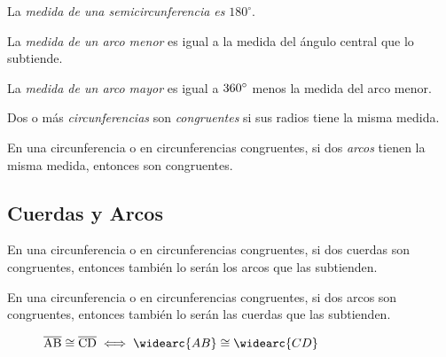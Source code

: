 \begin{definition}
    La \textit{medida de una semicircunferencia es} $180^{\circ}$.
\end{definition}

\begin{definition}
    La \textit{medida de un arco menor} es igual a la medida del ángulo central que lo subtiende.
\end{definition}

\begin{definition}
    La \textit{medida de un arco mayor} es igual a $360^{\circ}$ menos la medida del arco menor.
\end{definition}


\begin{definition}
    Dos o más \textit{circunferencias} son \textit{congruentes} si sus radios tiene la misma medida.
\end{definition}

\begin{definition}
    En una circunferencia o en circunferencias congruentes, si dos \textit{arcos} tienen la misma medida, entonces son congruentes.
\end{definition}

\clearpage

\subsection{Cuerdas y Arcos}

\begin{theorem}
    En una circunferencia o en circunferencias congruentes, si dos cuerdas son congruentes, entonces también lo serán los arcos que las subtienden.
\end{theorem}

\begin{theorem}
    En una circunferencia o en circunferencias congruentes, si dos arcos son congruentes, entonces también lo serán las cuerdas que las subtienden.
\end{theorem}

\begin{figure}[!h]
    \centering
    
    \caption{$\seg{AB} \cong \seg{CD} \iff \widearc{AB} \cong \widearc{CD}$}
    \label{fig:congruent-arcs-cords}
\end{figure}

